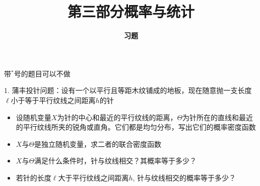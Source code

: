 \documentclass[10pt]{beamer}
\title[Probability \& Statistics]{\LARGE \bfseries 第三部分\quad 概率与统计} %
\author[Exercises] %
{\Large \bfseries 习题}
\date{}
\begin{document}

\begin{frame}

\titlepage %

\end{frame}





\begin{frame}

{\color{red} \scriptsize 带$^*$号的题目可以不做}

\vspace{1em}

1. 蒲丰投针问题：设有一个以平行且等距木纹铺成的地板，现在随意抛一支长度$\ell$小于等于平行纹线之间距离$h$的针
\vspace{0.6em}
\begin{itemize}
\item[(1)] 设随机变量$X$为针的中心和最近的平行纹线的距离，$\Theta$为针所在的直线和最近的平行纹线所夹的锐角或直角。它们都是均匀分布，写出它们的概率密度函数
\vspace{0.4em}
\item[(2)] $X$与$\Theta$是独立随机变量，求二者的联合密度函数
\vspace{0.4em}
\item[(3)] $X$与$\Theta$满足什么条件时，针与纹线相交？其概率等于多少？
\vspace{0.4em}
\item[(4$^*$)] 若针的长度$\ell$大于平行纹线之间距离$h$, 针与纹线相交的概率等于多少？
\end{itemize}

\end{frame}
\end{document}
